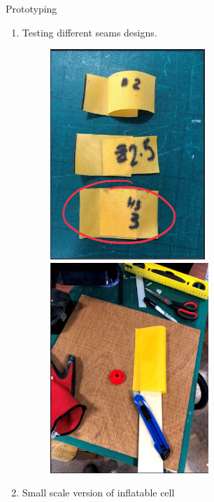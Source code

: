 \documentclass[final]{beamer}
\newlength{\onecolwid}
\newlength{\twocolwid}
\begin{document}
\begin{frame}
\begin{columns}[t]
\begin{column}{\twocolwid}
\begin{columns}[t,totalwidth=\twocolwid]
\begin{column}{\onecolwid}
\begin{block}{Prototyping}
\begin{enumerate}
\begin{figure}
\end{figure}
\item Testing different seams designs.
\begin{figure}
\includegraphics[height=300, width=0.5\linewidth]{img/Proto3.PNG}
\includegraphics[height=300, width=0.5\linewidth]{img/Proto5.PNG}
\end{figure}
\item Small scale version of inflatable cell
\end{enumerate}
\begin{figure}

\end{figure}
\end{block}
\end{column}
\end{columns}
\end{column}
\end{columns}
\end{frame}
\end{document}
